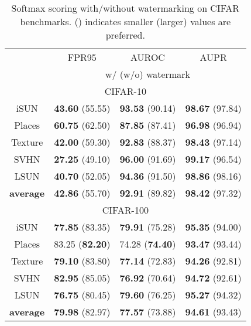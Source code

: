 \documentclass{article}
\begin{document}
\begin{table}[t]
\parbox{.47\linewidth}{
\centering
\caption{Softmax scoring with/without watermarking on CIFAR benchmarks.  () indicates smaller (larger) values are preferred.} \label{tab: softmax}
\vspace{5pt}
\scriptsize
{
\begin{tabular}{c|ccc}
\toprule[1.5pt]
                   & FPR95      & AUROC        & AUPR       \\
                   \cline{2-4} 
\multirow{-2}{*}{} & \multicolumn{3}{c}{w/ (w/o) watermark} \\
\midrule[0.6pt]
\multicolumn{4}{c}{\cellcolor{greyL}CIFAR-10} \\
\midrule[0.6pt]
iSUN               & \textbf{43.60} (55.55) & \textbf{93.53} (90.14) & \textbf{98.67} (97.84) \\ 
Places          & \textbf{60.75} (62.50) & \textbf{87.85} (87.41) & \textbf{96.98} (96.94) \\
Texture            & \textbf{42.00} (59.30) & \textbf{92.83} (88.37) & \textbf{98.43} (97.14) \\
SVHN               & \textbf{27.25} (49.10) & \textbf{96.00} (91.69) & \textbf{99.17} (96.54) \\
LSUN             & \textbf{40.70} (52.05) & \textbf{94.36} (91.50) & \textbf{98.86} (98.16) \\
\midrule
\textbf{average}   & \textbf{42.86} (55.70) & \textbf{92.91} (89.82) & \textbf{98.42} (97.32) \\ \midrule[1pt]
\multicolumn{4}{c}{\cellcolor{greyL}CIFAR-100} \\
\midrule[1pt]
iSUN               & \textbf{77.85} (83.35) & \textbf{79.91} (75.28) & \textbf{95.35} (94.00) \\ 
Places          & 83.25 (\textbf{82.20}) & 74.28 (\textbf{74.40}) & \textbf{93.47} (93.44) \\
Texture            & \textbf{79.10} (83.80) & \textbf{77.14} (72.83) & \textbf{94.26} (92.81) \\
SVHN               & \textbf{82.95} (85.05) & \textbf{76.92} (70.64) & \textbf{94.72} (92.61) \\
LSUN             & \textbf{76.75} (80.45) & \textbf{79.60} (76.25) & \textbf{95.27} (94.32) \\
\midrule
\textbf{average}   & \textbf{79.98} (82.97) & \textbf{77.57} (73.88) & \textbf{94.61} (93.43) \\ \bottomrule[1.5pt]      
\end{tabular}
}}~~~~

\end{table}
\end{document}
